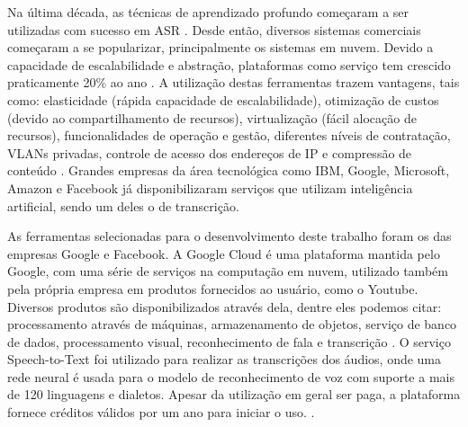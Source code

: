 
Na última década, as técnicas de aprendizado profundo começaram a ser utilizadas com sucesso em ASR \cite{dahl2011context}. Desde então, diversos sistemas comerciais começaram a se popularizar, principalmente os sistemas em nuvem. Devido a capacidade de escalabilidade e abstração, plataformas como serviço tem crescido praticamente 20\% ao ano \cite{krancher2018key}. 
A utilização destas ferramentas trazem vantagens, tais  como: elasticidade (rápida capacidade de escalabilidade), otimização de custos (devido ao compartilhamento de recursos),  virtualização  (fácil alocação  de  recursos), funcionalidades de operação e gestão, diferentes níveis de contratação,  VLANs privadas, controle de acesso dos endereços de IP e  compressão de conteúdo \cite{munteanumeeting}.
Grandes empresas da área tecnológica como IBM, Google, Microsoft, Amazon e Facebook já disponibilizaram serviços que utilizam inteligência artificial, sendo um deles o de transcrição. 


As ferramentas selecionadas para o desenvolvimento deste trabalho foram os das empresas Google e Facebook. 
A Google Cloud é uma plataforma mantida pelo Google, com  uma série de serviços na computação em nuvem, utilizado também pela própria empresa em produtos fornecidos ao usuário, como o Youtube. Diversos produtos são disponibilizados através dela, dentre eles podemos citar: processamento através de máquinas, armazenamento de objetos, serviço de banco de dados, processamento visual,  reconhecimento de fala e transcrição \cite{GoogleCloudGeral}. O serviço Speech-to-Text foi utilizado para realizar as transcrições dos áudios, onde uma rede neural é usada para o modelo de reconhecimento de voz com suporte a mais de 120 linguagens e dialetos. Apesar da utilização em geral ser paga, a plataforma fornece créditos válidos por um ano para iniciar o uso. \cite{kimura2018comparison}. 

